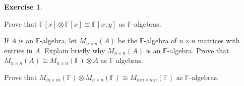 \documentclass{article}
\theoremstyle{definition}
\newtheorem{Exercise}{Exercise}
\theoremstyle{remark}
\theoremstyle{underline}
\theoremstyle{underline}
\begin{document}
	\begin{Exercise}
		\begin{subquests}
			\item Prove that $\mathbb{F}[x] \otimes \mathbb{F}[x] \cong \mathbb{F}[x,y]$ as $\mathbb{F}$-algebras.
			\item  If $A$ is an $\mathbb{F}$-algebra, let $M_{n \times n}(A)$ be the $\mathbb{F}$-algebra of $n \times n$ matrices with entries in $A$. Explain briefly why $M_{n\times n}(A)$ is an $\mathbb{F}$-algebra. Prove that $M_{n \times n}(A) \cong M_{n \times n}(\mathbb F) \otimes A$ as $\mathbb{F}$-algebras.
			\item  Prove that $M_{m\times m}(\mathbb F) \otimes M_{n\times n}(\mathbb F) \cong M_{mn \times mn}(\mathbb F)$ as $\mathbb F$-algebras.
		\end{subquests}
	\end{Exercise}
\end{document}

